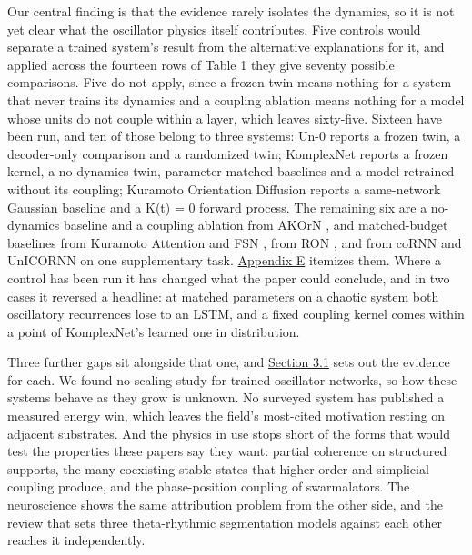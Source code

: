 \documentclass[10pt]{article}
\begin{document}
Our central finding is that the evidence rarely isolates the dynamics,
so it is not yet clear what the oscillator physics itself contributes.
Five controls would separate a trained system's result from the
alternative explanations for it, and applied across the fourteen rows of
Table 1 they give seventy possible comparisons. Five do not apply, since
a frozen twin means nothing for a system that never trains its dynamics
and a coupling ablation means nothing for a model whose units do not
couple within a layer, which leaves sixty-five. Sixteen have been run,
and ten of those belong to three systems: Un-0 \citep{un-0} reports a
frozen twin, a decoder-only comparison and a randomized twin; KomplexNet
\citep{muzellec2025} reports a frozen kernel, a no-dynamics twin,
parameter-matched baselines and a model retrained without its coupling;
Kuramoto Orientation Diffusion \citep{kuramoto-orientation-diffusion}
reports a same-network Gaussian baseline and a K(t) = 0 forward process.
The remaining six are a no-dynamics baseline and a coupling ablation
from AKOrN \citep{akorn}, and matched-budget baselines from Kuramoto
Attention \citep{kuramoto-attention} and FSN \citep{nunley2026}, from
RON \citep{ceni2024}, and from coRNN \citep{rusch2021} and UnICORNN
\citep{unicornn} on one supplementary task. \hyperref[sec-E]{Appendix E}
itemizes them. Where a control has been run it has changed what the
paper could conclude, and in two cases it reversed a headline: at
matched parameters on a chaotic system both oscillatory recurrences lose
to an LSTM, and a fixed coupling kernel comes within a point of
KomplexNet's learned one in distribution.

Three further gaps sit alongside that one, and
\hyperref[sec-3-1]{Section 3.1} sets out the evidence for each. We found
no scaling study for trained oscillator networks, so how these systems
behave as they grow is unknown. No surveyed system has published a
measured energy win, which leaves the field's most-cited motivation
resting on adjacent substrates. And the physics in use stops short of
the forms that would test the properties these papers say they want:
partial coherence on structured supports, the many coexisting stable
states that higher-order and simplicial coupling produce, and the
phase-position coupling of swarmalators. The neuroscience shows the same
attribution problem from the other side, and the review that sets three
theta-rhythmic segmentation models against each other
\citep{dogonasheva2026} reaches it independently.
\end{document}

